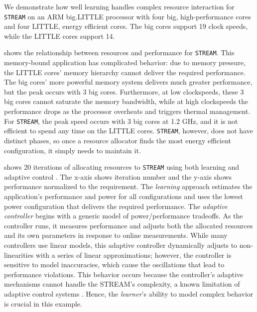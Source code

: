 We demonstrate how well learning handles complex resource interaction
for \texttt{STREAM} on an ARM big.LITTLE processor with four big,
high-performance cores and four LITTLE, energy efficient cores.  The
big cores support 19 clock speeds, while the LITTLE cores support 14.


 shows the relationship between resources
and performance for \texttt{STREAM}.  This memory-bound application
has complicated behavior: due to memory pressure, the LITTLE cores'
memory hierarchy cannot deliver the required performance.  The big
cores' more powerful memory system delivers much greater performance,
but the peak occurs with 3 big cores.  Furthermore, at low
clockspeeds, these 3 big cores cannot saturate the memory bandwidth,
while at high clockspeeds the performance drops as the processor
overheats and triggers thermal management.  For \texttt{STREAM}, the
peak speed occurs with 3 big cores at 1.2 GHz, and it is not efficient
to spend any time on the LITTLE cores.  \texttt{STREAM}, however, does
not have distinct phases, so once a resource allocator finds the most
energy efficient configuration, it simply needs to maintain it.

 shows 20 iterations of allocating
resources to \texttt{STREAM} using both learning \cite{LEO} and
adaptive control \cite{POET}.  The x-axis shows iteration number and
the y-axis shows performance normalized to the requirement.  The
\emph{learning} approach estimates the application's performance and
power for all configurations and uses the lowest power configuration
that delivers the required performance.  The \emph{adaptive
  controller} begins with a generic model of power/performance
tradeoffs.  As the controller runs, it measures performance and
adjusts both the allocated resources and its own parameters in
response to online measurements.  While many controllers use linear
models, this adaptive controller dynamically adjusts to
non-linearities with a series of linear approximations; however, the
controller is sensitive to model inaccuracies, which cause the
oscillations that lead to performance violations.  This behavior
occurs because the controller's adaptive mechanisms cannot handle the
STREAM's complexity, a known limitation of adaptive control systems
\cite{ControlWare,POET,ICSE2014}.  Hence, the \emph{learner}'s ability
to model complex behavior is crucial in this example.

